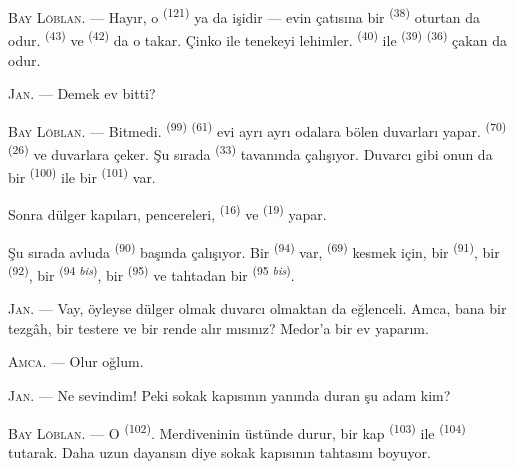 \textsc{Bay Löblan}. --- Hayır, o 
\textsuperscript{(121)} ya da  işidir --- evin çatısına
bir  \textsuperscript{(38)} oturtan da odur.
 \textsuperscript{(43)} ve 
\textsuperscript{(42)} da o takar. Çinko ile tenekeyi lehimler.
 \textsuperscript{(40)} ile 
\textsuperscript{(39)}  \textsuperscript{(36)} çakan da odur.

\textsc{Jan}. --- Demek ev bitti?

\VUsaut{3.0mm}
\VUsaut{3.0mm}

\textsc{Bay Löblan}. --- Bitmedi.  \textsuperscript{(99)}
 \textsuperscript{(61)} evi ayrı ayrı odalara bölen duvarları
yapar.  \textsuperscript{(70)} 
\textsuperscript{(26)} ve duvarlara çeker. Şu sırada 
\textsuperscript{(33)} tavanında çalışıyor. Duvarcı gibi onun da bir
 \textsuperscript{(100)} ile bir 
\textsuperscript{(101)} var.

Sonra dülger kapıları, pencereleri, 
\textsuperscript{(16)} ve  \textsuperscript{(19)} yapar.

Şu sırada avluda  \textsuperscript{(90)} başında
çalışıyor. Bir  \textsuperscript{(94)} var,
 \textsuperscript{(69)} kesmek için, bir 
\textsuperscript{(91)}, bir  \textsuperscript{(92)}, bir
 \textsuperscript{(94 \textit{bis})}, bir 
\textsuperscript{(95)} ve tahtadan bir 
\textsuperscript{(95 \textit{bis})}.

\textsc{Jan}. --- Vay, öyleyse dülger olmak duvarcı olmaktan da eğlenceli.
Amca, bana bir tezgâh, bir testere ve bir rende alır mısınız? Medor'a bir ev
yaparım.

\textsc{Amca}. --- Olur oğlum.

\textsc{Jan}. --- Ne sevindim! Peki sokak kapısının yanında duran şu adam
kim?

\VUsaut{3.0mm}
\VUsaut{3.0mm}

\textsc{Bay Löblan}. --- O  \textsuperscript{(102)}.
Merdiveninin üstünde durur, bir kap  \textsuperscript{(103)} ile
 \textsuperscript{(104)} tutarak. Daha uzun dayansın diye
sokak kapısının tahtasını boyuyor.

